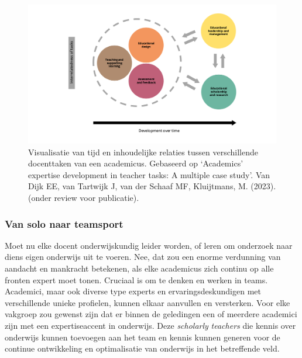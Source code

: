 \documentclass[smallauthor, chapterhaspagenum, nochapterinheader, pagenuminheader,  bigchapnum,medium2, tocpages, garamond, titleinheader]{jote-book}
\begin{document}
	\begin{figure}
		\includegraphics[width=\linewidth]{media/image9.png}



		\label{fig:rId24}



		\caption{Visualisatie van tijd en inhoudelijke relaties tussen verschillende docenttaken van een academicus. Gebaseerd op ‘Academics' expertise development in teacher tasks: A multiple case study'. Van Dijk EE, van Tartwijk J, van der Schaaf MF, Kluijtmans, M. (2023). (onder review voor publicatie).}
	\end{figure}



	\subsubsection{Van solo naar teamsport}



	Moet nu elke docent onderwijskundig leider worden, of leren om onderzoek naar diens eigen onderwijs uit te voeren. Nee, dat zou een enorme verdunning van aandacht en mankracht betekenen, als elke academicus zich continu op alle fronten expert moet tonen. Cruciaal is om te denken en werken in teams. Academici, maar ook diverse type experts en ervaringsdeskundigen met verschillende unieke profielen, kunnen elkaar aanvullen en versterken. Voor elke vakgroep zou gewenst zijn dat er binnen de geledingen een of meerdere academici zijn met een expertiseaccent in onderwijs. Deze \emph{scholarly}\emph{ }\emph{teachers} die kennis over onderwijs kunnen toevoegen aan het team en kennis kunnen generen voor de continue ontwikkeling en optimalisatie van onderwijs in het betreffende veld.
\end{document}
